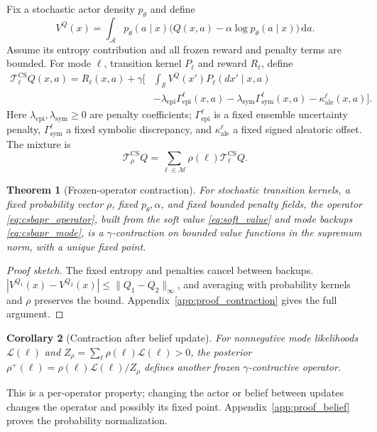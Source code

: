 \documentclass[10pt]{article}
\newtheorem{theorem}{Theorem}[section]
\newtheorem{corollary}[theorem]{Corollary}
\begin{document}
Fix a stochastic actor density $p_\theta$ and define
\begin{equation}
V^Q(x)=\int_{\mathcal{A}}p_\theta(a\mid x)
\bigl(Q(x,a)-\alpha\log p_\theta(a\mid x)\bigr)\,\mathrm d a.
\label{eq:soft_value}
\end{equation}
Assume its entropy contribution and all frozen reward and penalty terms are bounded. For mode $\ell$, transition kernel $P_\ell$ and reward $R_\ell$, define
\begin{equation}
\begin{split}
\mathcal{T}^{\mathrm{CS}}_\ell Q(x,a)=R_\ell(x,a)+\gamma\bigg[
&\int_{\mathcal{S}}V^Q(x')P_\ell(dx'\mid x,a)\\
&-\lambda_{\mathrm{epi}}\Gamma_{\mathrm{epi}}^\ell(x,a)
-\lambda_{\mathrm{sym}}\Gamma_{\mathrm{sym}}^\ell(x,a)
-\kappa_{\mathrm{ale}}^\ell(x,a)\bigg].
\end{split}
\label{eq:csbapr_mode}
\end{equation}
Here $\lambda_{\mathrm{epi}},\lambda_{\mathrm{sym}}\geq0$ are penalty coefficients;
$\Gamma_{\mathrm{epi}}^\ell$ is a fixed ensemble uncertainty penalty,
$\Gamma_{\mathrm{sym}}^\ell$ a fixed symbolic discrepancy,
and $\kappa_{\mathrm{ale}}^\ell$ a fixed signed aleatoric offset.
The mixture is
\begin{equation}
\mathcal{T}^{\mathrm{CS}}_\rho Q
=\sum_{\ell\in\mathcal{M}}\rho(\ell)\mathcal{T}^{\mathrm{CS}}_\ell Q.
\label{eq:csbapr_operator}
\end{equation}

\begin{theorem}[Frozen-operator contraction]
\label{thm:csbapr_contraction}
For stochastic transition kernels, a fixed probability vector $\rho$, fixed $p_\theta,\alpha$, and fixed bounded penalty fields, the operator \eqref{eq:csbapr_operator}, built from the soft value \eqref{eq:soft_value} and mode backups \eqref{eq:csbapr_mode}, is a $\gamma$-contraction on bounded value functions in the supremum norm, with a unique fixed point.
\end{theorem}
\begin{proof}[Proof sketch]
The fixed entropy and penalties cancel between backups.
$|V^{Q_1}(x)-V^{Q_2}(x)|\leq\|Q_1-Q_2\|_\infty$,
and averaging with probability kernels and $\rho$ preserves the bound.
Appendix~\ref{app:proof_contraction} gives the full argument.
\end{proof}

\begin{corollary}[Contraction after belief update]
\label{cor:belief_update}
For nonnegative mode likelihoods $\mathscr{L}(\ell)$ and
$Z_\rho=\sum_\ell\rho(\ell)\mathscr{L}(\ell)>0$,
the posterior
$\rho^+(\ell)=\rho(\ell)\mathscr{L}(\ell)/Z_\rho$
defines another frozen $\gamma$-contractive operator.
\end{corollary}
This is a per-operator property; changing the actor or belief between updates changes the operator and possibly its fixed point. Appendix~\ref{app:proof_belief} proves the probability normalization.
\end{document}

